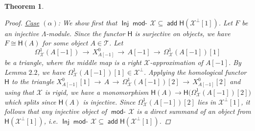 \documentclass[oneside, a4paper,reqno]{amsart}
\numberwithin{equation}{section}
\newtheorem{thm}{Theorem}[section]
\theoremstyle{definition}
\begin{document}
\begin{thm}
\begin{proof}
  \underline{\textsf{Case}} $(\alpha)$:  We show first that $\operatorname*{\mathsf{Inj}}\operatorname*{\mathsf{mod}-\!}{\mathcal X} \subseteq \operatorname*{\mathsf{add}} \mathsf{H}({\mathcal X}^{\bot}[1])$. Let $F$ be an injective $\Lambda$-module. Since the functor $\mathsf{H}$ is surjective on objects, we have $F \cong \mathsf{H}(A)$ for some object $A\in {\mathcal T}$. Let 
\[
\Omega^{1}_{\mathcal X}(A[-1]) \, {\longrightarrow} \, X^{0}_{A[-1]} \, {\longrightarrow} \,  A[-1] \, {\longrightarrow} \, \Omega^{1}_{\mathcal X}(A[-1])[1]
\] be a triangle, where the middle map is a right ${\mathcal X}$-approximation of $A[-1]$. By Lemma $2.2$, we have $\Omega^{1}_{\mathcal X}(A[-1])[1] \in {\mathcal X}^{\bot}$. Applying the homological functor $\mathsf{H}$ to the triangle  
$
X^{0}_{A[-1]}[1] \, {\longrightarrow} \,  A \,  {\longrightarrow} \, \Omega^{1}_{\mathcal X}(A[-1])[2] \, {\longrightarrow} \,  X^{0}_{A[-1]}[2]
$ and using that ${\mathcal X}$ is rigid, we have a monomorphism $\mathsf{H}(A) {\longrightarrow} \mathsf{H}\big(\Omega^{1}_{\mathcal X}(A[-1])[2]\big)$ which splits since $\mathsf{H}(A)$ is injective. Since  $\Omega^{1}_{\mathcal X}(A[-1])[2]$ lies in ${\mathcal X}^{\bot}[1]$, it follows that any injective object of $\operatorname*{\mathsf{mod}-\!}{\mathcal X}$ is a direct summand of an object from $\mathsf{H}({\mathcal X}^{\bot}[1])$, i.e. $\operatorname*{\mathsf{Inj}}\operatorname*{\mathsf{mod}-\!}{\mathcal X} \subseteq \operatorname*{\mathsf{add}} \mathsf{H}({\mathcal X}^{\bot}[1])$. 


\end{proof}
\end{thm}
\end{document}
